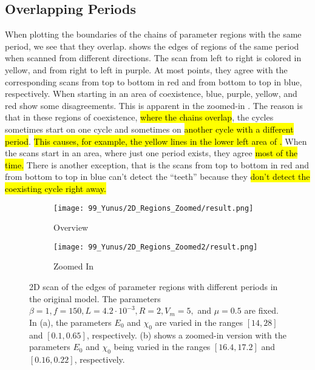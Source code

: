 \subsection{Overlapping Periods}

When plotting the boundaries of the chains of parameter regions with the same period, we see that they overlap.
 shows the edges of regions of the same period when scanned from different directions.
The scan from left to right is colored in yellow, and from right to left in purple.
At most points, they agree with the corresponding scans from top to bottom in red and from bottom to top in blue, respectively.
When starting in an area of coexistence, blue, purple, yellow, and red show some disagreements.
This is apparent in the zoomed-in .
The reason is that in these regions of coexistence, \hl{where the chains overlap}, the cycles sometimes start on one cycle and sometimes on \hl{another cycle with a different period}.
\hl{This causes, for example, the yellow lines in the lower left area of .}
When the scans start in an area, where just one period exists, they agree \hl{most of the time.}
There is another exception, that is the scans from top to bottom in red and from bottom to top in blue can't detect the ``teeth'' because they \hl{don't detect the coexisting cycle right away.}

\begin{figure}
	\centering
	\begin{subfigure}{0.4\textwidth}
		\texttt{[image: 99\_Yunus/2D\_Regions\_Zoomed/result.png]}
		\caption{Overview}
		\label{fig:state.og.overlapping.chains}
	\end{subfigure}
	\begin{subfigure}{0.4\textwidth}
		\texttt{[image: 99\_Yunus/2D\_Regions\_Zoomed2/result.png]}
		\caption{Zoomed In}
		\label{fig:state.og.overlapping.chains.zoomed}
	\end{subfigure}
	\caption[2D scan of the edges of parameter regions with different periods in the original model]{
		2D scan of the edges of parameter regions with different periods in the original model.
		The parameters $\beta = 1, f = 150, L = 4.2 \cdot 10^{-3}, R = 2, V_m = 5,$ and $\mu = 0.5$ are fixed.
		In (a), the parameters $E_0$ and $\chi_0$ are varied in the ranges $[14, 28]$ and $[0.1, 0.65]$, respectively.
		(b) shows a zoomed-in version with the parameters $E_0$ and $\chi_0$ being varied in the ranges $[16.4, 17.2]$ and $[0.16, 0.22]$, respectively.
	}
\end{figure}

